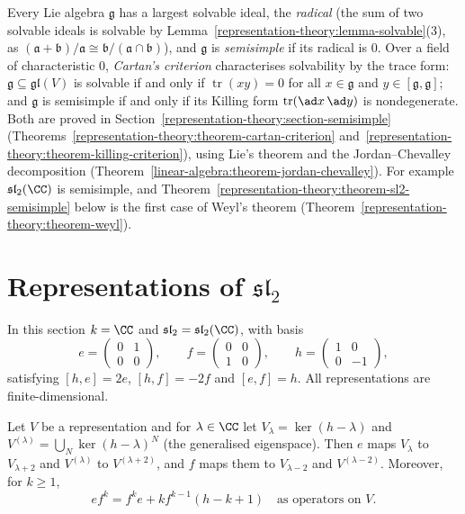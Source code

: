\begin{remark}\label{representation-theory:remark-cartan-criterion}
Every Lie algebra $\mathfrak{g}$ has a largest solvable ideal, the \emph{radical} (the sum of two solvable ideals is solvable by
Lemma~\ref{representation-theory:lemma-solvable}(3), as $(\mathfrak{a} + \mathfrak{b})/\mathfrak{a} \cong \mathfrak{b}/(\mathfrak{a} \cap \mathfrak{b})$), and
$\mathfrak{g}$ is \emph{semisimple} if its radical is $0$. Over a field of characteristic $0$, \emph{Cartan's criterion} characterises solvability by the trace form:
$\mathfrak{g} \subseteq \mathfrak{gl}(V)$ is solvable if and only if $\operatorname{tr}(xy) = 0$ for all $x \in \mathfrak{g}$ and $y \in [\mathfrak{g}, \mathfrak{g}]$;
and $\mathfrak{g}$ is semisimple if and only if its Killing form $\operatorname{tr}(\ad x\,\ad y)$ is nondegenerate. Both are proved in Section~\ref{representation-theory:section-semisimple}
(Theorems~\ref{representation-theory:theorem-cartan-criterion} and~\ref{representation-theory:theorem-killing-criterion}), using Lie's theorem and the Jordan--Chevalley
decomposition (Theorem~\ref{linear-algebra:theorem-jordan-chevalley}). For example $\mathfrak{sl}_2(\CC)$ is semisimple, and
Theorem~\ref{representation-theory:theorem-sl2-semisimple} below is the first case of Weyl's theorem (Theorem~\ref{representation-theory:theorem-weyl}).
\end{remark}

\section{Representations of $\mathfrak{sl}_2$}\label{representation-theory:section-sl2}

In this section $k = \CC$ and $\mathfrak{sl}_2 = \mathfrak{sl}_2(\CC)$, with basis
\[
e = \begin{pmatrix} 0 & 1 \\ 0 & 0 \end{pmatrix}, \qquad f = \begin{pmatrix} 0 & 0 \\ 1 & 0 \end{pmatrix}, \qquad
h = \begin{pmatrix} 1 & 0 \\ 0 & -1 \end{pmatrix},
\]
satisfying $[h, e] = 2e$, $[h, f] = -2f$ and $[e, f] = h$. All representations are finite-dimensional.

\begin{lemma}\label{representation-theory:lemma-sl2-weights}
Let $V$ be a representation and for $\lambda \in \CC$ let $V_\lambda = \ker(h - \lambda)$ and
$V^{(\lambda)} = \bigcup_N \ker(h - \lambda)^N$ (the generalised eigenspace). Then $e$ maps $V_\lambda$ to $V_{\lambda + 2}$ and
$V^{(\lambda)}$ to $V^{(\lambda + 2)}$, and $f$ maps them to $V_{\lambda - 2}$ and $V^{(\lambda - 2)}$. Moreover, for $k \geq 1$,
\[
e f^k = f^k e + k f^{k-1}(h - k + 1) \quad \text{as operators on } V.
\]
\end{lemma}


